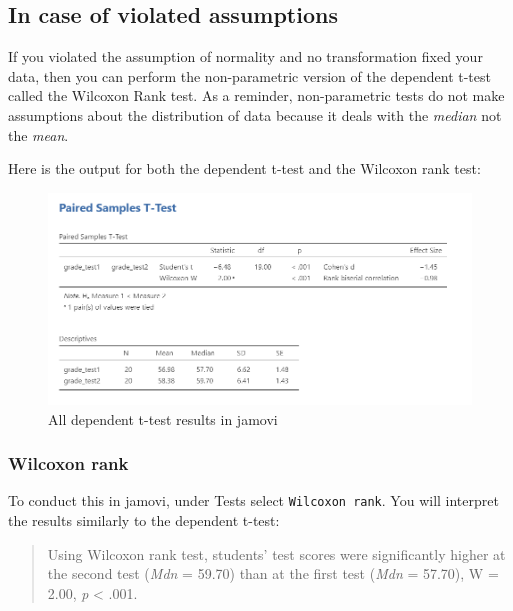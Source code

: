 \documentclass[
]{book}
\begin{document}
\hypertarget{in-case-of-violated-assumptions-2}{%
\subsection{In case of violated assumptions}\label{in-case-of-violated-assumptions-2}}

If you violated the assumption of normality and no transformation fixed your data, then you can perform the non-parametric version of the dependent t-test called the Wilcoxon Rank test. As a reminder, non-parametric tests do not make assumptions about the distribution of data because it deals with the \emph{median} not the \emph{mean}.

Here is the output for both the dependent t-test and the Wilcoxon rank test:

\begin{figure}

{\centering \includegraphics[width=1\linewidth]{images/03_dependent_t-test/dependent_results_full} 

}

\caption{All dependent t-test results in jamovi}\label{fig:unnamed-chunk-11}
\end{figure}

\hypertarget{wilcoxon-rank}{%
\subsubsection{Wilcoxon rank}\label{wilcoxon-rank}}

To conduct this in jamovi, under Tests select \texttt{Wilcoxon\ rank}. You will interpret the results similarly to the dependent t-test:

\begin{quote}
Using Wilcoxon rank test, students' test scores were significantly higher at the second test (\emph{Mdn} = 59.70) than at the first test (\emph{Mdn} = 57.70), W = 2.00, \emph{p} \textless{} .001.
\end{quote}
\end{document}
